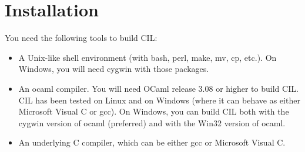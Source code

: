 \documentclass[letterpaper]{article}
\begin{document}
\section{Installation}

 You need the following tools to build CIL:
\begin{itemize}
\item A Unix-like shell environment (with bash, perl, make, mv, cp,
  etc.). On Windows, you will need cygwin with those packages.
\item An ocaml compiler. You will need OCaml release 3.08 or higher to build
CIL. CIL has been tested on Linux and on Windows (where it can behave as
either Microsoft Visual C or gcc). On Windows, you can build CIL both with the
cygwin version of ocaml (preferred) and with the Win32 version of ocaml.
\item An underlying C compiler, which can be either gcc or Microsoft Visual C.
\end{itemize}
\end{document}

